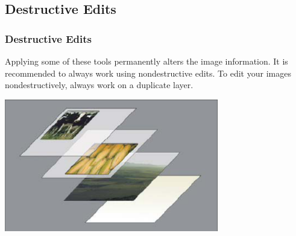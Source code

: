 \documentclass{beamer}
\begin{document}
			\subsection{Destructive Edits}		
			\begin{frame}
				\frametitle{Destructive Edits}
				\begin{outline}
					\1 Applying some of these tools permanently alters the image information.
					\1 It is recommended to always work using nondestructive edits.
					\1 To edit your images nondestructively, always work on a duplicate layer. 
				\end{outline}
				\begin{center}
					\includegraphics[width=0.7\textwidth]{images/layers example.png}
				\end{center}	
			\end{frame}
	
\end{document}
